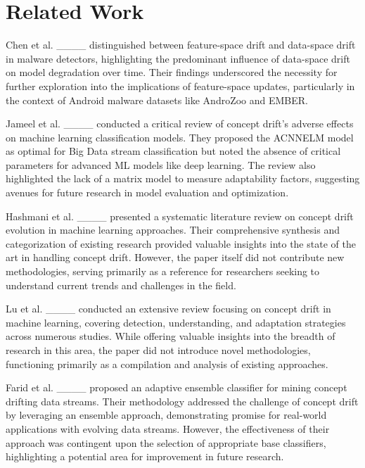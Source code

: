 \section{Related Work}
\label{sec:related}

Chen et al. ____ distinguished between feature-space drift and data-space drift in malware detectors, highlighting the predominant influence of data-space drift on model degradation over time. Their findings underscored the necessity for further exploration into the implications of feature-space updates, particularly in the context of Android malware datasets like AndroZoo and EMBER.

Jameel et al. ____  conducted a critical review of concept drift's adverse effects on machine learning classification models. They proposed the ACNNELM model as optimal for Big Data stream classification but noted the absence of critical parameters for advanced ML models like deep learning. The review also highlighted the lack of a matrix model to measure adaptability factors, suggesting avenues for future research in model evaluation and optimization.

Hashmani et al. ____ presented a systematic literature review on concept drift evolution in machine learning approaches. Their comprehensive synthesis and categorization of existing research provided valuable insights into the state of the art in handling concept drift. However, the paper itself did not contribute new methodologies, serving primarily as a reference for researchers seeking to understand current trends and challenges in the field.

Lu et al. ____ conducted an extensive review focusing on concept drift in machine learning, covering detection, understanding, and adaptation strategies across numerous studies. While offering valuable insights into the breadth of research in this area, the paper did not introduce novel methodologies, functioning primarily as a compilation and analysis of existing approaches.

Farid et al. ____ proposed an adaptive ensemble classifier for mining concept drifting data streams. Their methodology addressed the challenge of concept drift by leveraging an ensemble approach, demonstrating promise for real-world applications with evolving data streams. However, the effectiveness of their approach was contingent upon the selection of appropriate base classifiers, highlighting a potential area for improvement in future research.